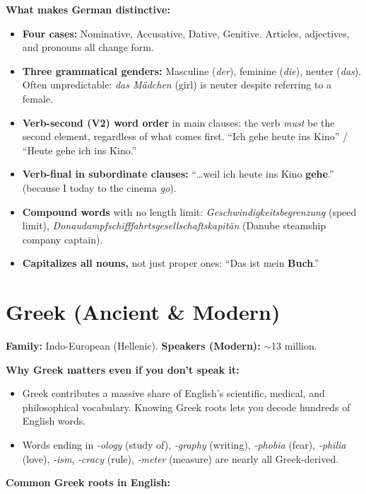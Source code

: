 \documentclass[11pt, letterpaper]{article}
\begin{document}
\textbf{What makes German distinctive:}
\begin{itemize}[noitemsep]
  \item \textbf{Four cases:} Nominative, Accusative, Dative, Genitive. Articles, adjectives, and pronouns all change form.
  \item \textbf{Three grammatical genders:} Masculine (\emph{der}), feminine (\emph{die}), neuter (\emph{das}). Often unpredictable: \emph{das M\"adchen} (girl) is neuter despite referring to a female.
  \item \textbf{Verb-second (V2) word order} in main clauses: the verb \emph{must} be the second element, regardless of what comes first. ``Ich gehe heute ins Kino'' / ``Heute gehe ich ins Kino.''
  \item \textbf{Verb-final in subordinate clauses:} ``\ldots weil ich heute ins Kino \textbf{gehe}.'' (because I today to the cinema \emph{go}).
  \item \textbf{Compound words} with no length limit: \emph{Geschwindigkeitsbegrenzung} (speed limit), \emph{Donau\-dampfschifffahrtsgesellschaftskapit\"an} (Danube steamship company captain).
  \item \textbf{Capitalizes all nouns,} not just proper ones: ``Das ist mein \textbf{Buch}.''
\end{itemize}

\section*{Greek (Ancient \& Modern)}

\textbf{Family:} Indo-European (Hellenic). \textbf{Speakers (Modern):} $\sim$13 million.

\textbf{Why Greek matters even if you don't speak it:}
\begin{itemize}[noitemsep]
  \item Greek contributes a massive share of English's scientific, medical, and philosophical vocabulary. Knowing Greek roots lets you decode hundreds of English words.
  \item Words ending in \emph{-ology} (study of), \emph{-graphy} (writing), \emph{-phobia} (fear), \emph{-philia} (love), \emph{-ism}, \emph{-cracy} (rule), \emph{-meter} (measure) are nearly all Greek-derived.
\end{itemize}

\textbf{Common Greek roots in English:}
\end{document}
